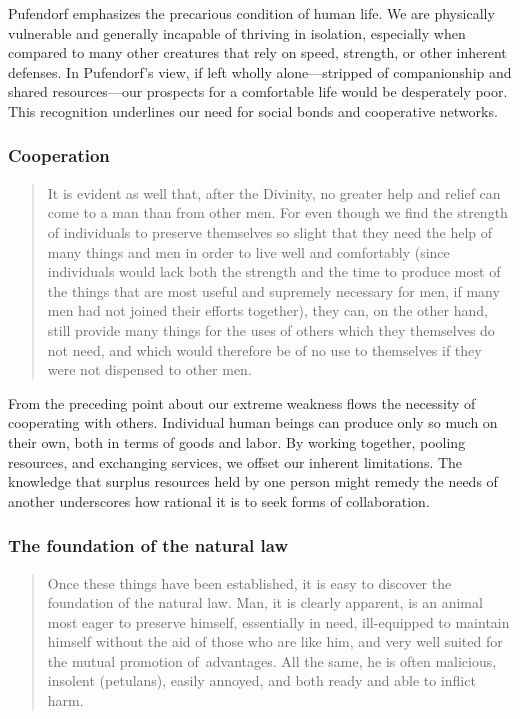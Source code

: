             Pufendorf emphasizes the precarious condition of human life. We are physically vulnerable and generally incapable of thriving in isolation, especially when compared to many other creatures that rely on speed, strength, or other inherent defenses. In Pufendorf’s view, if left wholly alone—stripped of companionship and shared resources—our prospects for a comfortable life would be desperately poor. This recognition underlines our need for social bonds and cooperative networks.

        \subsubsection{Cooperation}

            \begin{quote}
                It is evident as well that, after the Divinity, no greater help and relief can come to a man than from other men. For even though we find the strength of individuals to preserve themselves so slight that they need the help of many things and men in order to live well and comfortably (since individuals would lack both the strength and the time to produce most of the things that are most useful and supremely necessary for men, if many men had not joined their efforts together), they can, on the other hand, still provide many things for the uses of others which they themselves do not need, and which would therefore be of no use to themselves if they were not dispensed to other men.
            \end{quote}

            From the preceding point about our extreme weakness flows the necessity of cooperating with others. Individual human beings can produce only so much on their own, both in terms of goods and labor. By working together, pooling resources, and exchanging services, we offset our inherent limitations. The knowledge that surplus resources held by one person might remedy the needs of another underscores how rational it is to seek forms of collaboration.

        \subsubsection{The foundation of the natural law}

            \begin{quote}
                Once these things have been established, it is easy to discover the foundation of the natural law. Man, it is clearly apparent, is an animal most eager to preserve himself, essentially in need, ill-equipped to maintain himself without the aid of those who are like him, and very well suited for the mutual promotion of advantages. All the same, he is often malicious, insolent (petulans), easily annoyed, and both ready and able to inflict harm.
            \end{quote}

